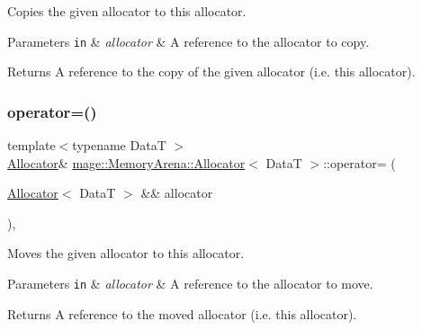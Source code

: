 Copies the given allocator to this allocator.


\begin{DoxyParams}[1]{Parameters}
\mbox{\tt in}  & {\em allocator} & A reference to the allocator to copy. \\
\hline
\end{DoxyParams}
\begin{DoxyReturn}{Returns}
A reference to the copy of the given allocator (i.\+e. this allocator). 
\end{DoxyReturn}
\hypertarget{structmage_1_1_memory_arena_1_1_allocator_a3b57cb5e78f00b8d024a042cbfae679d}{}\label{structmage_1_1_memory_arena_1_1_allocator_a3b57cb5e78f00b8d024a042cbfae679d} 
\subsubsection{\texorpdfstring{operator=()}{operator=()}\hspace{0.1cm}{\footnotesize\ttfamily [2/2]}}
{\footnotesize\ttfamily template$<$typename DataT $>$ \\
\hyperlink{structmage_1_1_memory_arena_1_1_allocator}{Allocator}\& \hyperlink{structmage_1_1_memory_arena_1_1_allocator}{mage\+::\+Memory\+Arena\+::\+Allocator}$<$ DataT $>$\+::operator= (\begin{DoxyParamCaption}\item[{\hyperlink{structmage_1_1_memory_arena_1_1_allocator}{Allocator}$<$ DataT $>$ \&\&}]{allocator }\end{DoxyParamCaption})\hspace{0.3cm}{\ttfamily [default]}, {\ttfamily [noexcept]}}

Moves the given allocator to this allocator.


\begin{DoxyParams}[1]{Parameters}
\mbox{\tt in}  & {\em allocator} & A reference to the allocator to move. \\
\hline
\end{DoxyParams}
\begin{DoxyReturn}{Returns}
A reference to the moved allocator (i.\+e. this allocator). 
\end{DoxyReturn}
\hypertarget{structmage_1_1_memory_arena_1_1_allocator_a7f7971d1bd4522ef847d30d1c5cf3666}{}\label{structmage_1_1_memory_arena_1_1_allocator_a7f7971d1bd4522ef847d30d1c5cf3666} 
